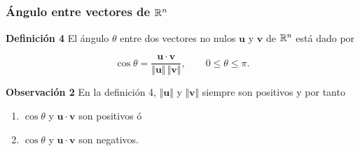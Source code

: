 \subsection{}

\begin{frame}\frametitle{Ángulo entre vectores de $\mathbb{R}^n$}

\begin{defi}{\textbf{Definición 4}}\justifying
	\justifying
	El ángulo $\theta$ entre dos vectores no nulos $\mathbf{u}$ y $\mathbf{v}$ de $\mathbb{R}^n$ 
	está dado por
	
	\vspace{-0mm}
	\[
	\cos\theta = \frac{\mathbf{u}\cdot \mathbf{v}}{\Vert \mathbf{u}\Vert \, \Vert \mathbf{v}\Vert} , \qquad 0\leq \theta\leq \pi.
	\]
\end{defi}	

\begin{alertblock}{\textbf{Observación 2}}\justifying
	En la definición 4, $\Vert \mathbf{u}\Vert$ y $\Vert \mathbf{v}\Vert$ siempre son positivos y por tanto
	
	\vspace{-2mm}
	\begin{multicols}{2}
		\begin{enumerate}
			\item[\labelname{$a$}] $\cos\theta$ y $\mathbf{u}\cdot \mathbf{v}$ son positivos ó
			\item[\labelname{$b$}] $\cos\theta$ y $\mathbf{u}\cdot \mathbf{v}$ son negativos.\\
		\end{enumerate}
	\end{multicols}
	
\end{alertblock}

\vspace{-2mm}


\end{frame}
